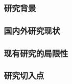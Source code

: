 
\subsubsection{研究背景}
\justifying\indent

\subsubsection{国内外研究现状}
\indent

\subsubsection{现有研究的局限性}
\indent

\subsubsection{研究切入点}
\indent
